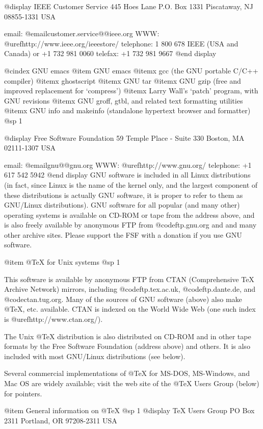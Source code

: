 {{{{{{{{{@display
IEEE Customer Service
445 Hoes Lane
P.O. Box 1331
Piscataway, NJ 08855-1331 USA

email: @email{customer.service@@ieee.org}
WWW: @uref{http://www.ieee.org/ieeestore/}
telephone: 1 800 678 IEEE (USA and Canada) or +1 732 981 0060
telefax: +1 732 981 9667
@end display

@cindex GNU emacs
@item GNU emacs
@itemx gcc (the GNU portable C/C++ compiler)
@itemx ghostscript
@itemx GNU tar
@itemx GNU gzip (free and improved replacement for `compress')
@itemx Larry Wall's `patch' program, with GNU revisions
@itemx GNU groff, gtbl, and related text formatting utilities
@itemx GNU info and makeinfo (standalone hypertext browser and formatter)
@sp 1

@display
Free Software Foundation
59 Temple Place - Suite 330
Boston, MA 02111-1307 USA

email: @email{gnu@@gnu.org}
WWW: @uref{http://www.gnu.org/}
telephone: +1 617 542 5942
@end display
GNU software is included in all Linux distributions (in fact, since Linux
is the name of the kernel only, and the largest component of these
distributions is actually GNU software, it is proper to refer to them as
GNU/Linux distributions).  GNU software for all popular (and many other)
operating systems is available on CD-ROM or tape from the address above, and
is also freely available by anonymous FTP from @code{ftp.gnu.org} and and many
other archive sites.  Please support the FSF with a donation if you use GNU
software.

@item @TeX{} for Unix systems
@sp 1

This software is available by anonymous FTP from CTAN (Comprehensive TeX
Archive Network) mirrors, including @code{ftp.tex.ac.uk}, @code{ftp.dante.de},
and @code{ctan.tug.org}.  Many of the sources of GNU software (above) also make
@TeX{}, etc. available.  CTAN is indexed on the World Wide Web (one such index
is @uref{http://www.ctan.org/}).

The Unix @TeX{} distribution is also distributed on CD-ROM and in other tape
formats by the Free Software Foundation (address above) and others.  It is
also included with most GNU/Linux distributions (see below).

Several commercial implementations of @TeX{} for MS-DOS, MS-Windows, and Mac OS
are widely available;  visit the web site of the @TeX{} Users Group (below) for
pointers.

@item General information on @TeX{}
@sp 1
@display
TeX Users Group
PO Box 2311
Portland, OR 97208-2311 USA

}}}}}}}}}
